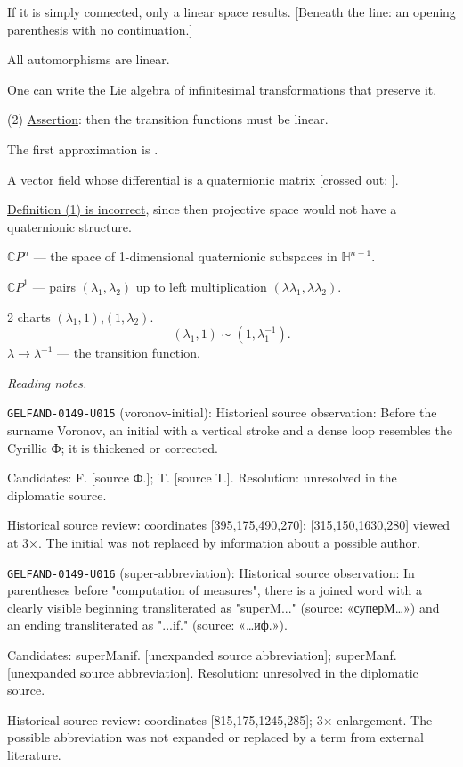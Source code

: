 If it is simply connected, only a linear space results.
[Beneath the line: an opening parenthesis with no continuation.]

All automorphisms are linear.

One can write the Lie algebra of infinitesimal transformations that preserve it.

(2) \underline{Assertion}: then the transition functions must be linear.

The first approximation is .

A vector field whose differential is a quaternionic matrix
[crossed out: ].

\underline{Definition (1) is incorrect}, since then projective space would not
have a quaternionic structure.

$\mathbb C P^n$ --- the space of 1-dimensional quaternionic subspaces in $\mathbb H^{n+1}$.

$\mathbb C P^1$ --- pairs $(\lambda_1,\lambda_2)$ up to left multiplication
$(\lambda\lambda_1,\lambda\lambda_2)$.

2 charts \quad $(\lambda_1,1)$,\quad $(1,\lambda_2)$.
\begin{equation*}
(\lambda_1,1)\sim(1,\lambda_1^{-1}).
\end{equation*}
$\lambda\to\lambda^{-1}$ --- the transition function.


\par\smallskip\noindent\textit{Reading notes.}\par
\noindent\texttt{GELFAND-0149-U015} (voronov-initial): Historical source observation: Before the surname Voronov, an initial with a vertical stroke and a dense loop resembles the Cyrillic Ф; it is thickened or corrected.\par
Candidates: F. [source Ф.]; T. [source Т.]. Resolution: unresolved in the diplomatic source.\par
Historical source review: coordinates [395,175,490,270]; [315,150,1630,280] viewed at 3×. The initial was not replaced by information about a possible author.\par

\noindent\texttt{GELFAND-0149-U016} (super-abbreviation): Historical source observation: In parentheses before "computation of measures", there is a joined word with a clearly visible beginning transliterated as "superM..." (source: «суперМ…») and an ending transliterated as "...if." (source: «…иф.»).\par
Candidates: superManif. [unexpanded source abbreviation]; superManf. [unexpanded source abbreviation]. Resolution: unresolved in the diplomatic source.\par
Historical source review: coordinates [815,175,1245,285]; 3× enlargement. The possible abbreviation was not expanded or replaced by a term from external literature.\par

